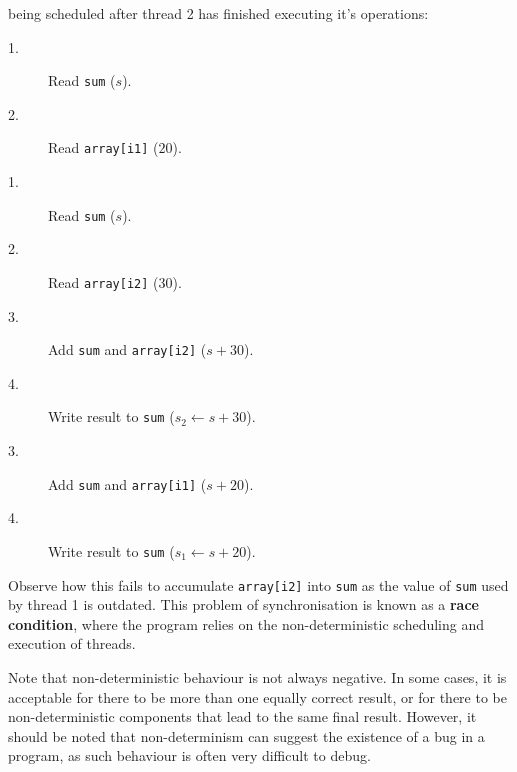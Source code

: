 \documentclass{article}
\begin{document}
being scheduled after thread 2 has finished executing it's operations:
\begin{description}
    \item [1.] Read \texttt{sum} (\(s\)).
    \item [2.] Read \texttt{array[i1]} (\(20\)).
    \item [1.] Read \texttt{sum} (\(s\)).
          \raggedleft
    \item [2.] Read \texttt{array[i2]} (\(30\)).
    \item [3.] Add \texttt{sum} and \texttt{array[i2]} (\(s + 30\)).
    \item [4.] Write result to \texttt{sum} (\(s_2 \gets s + 30\)).
    \item [3.] Add \texttt{sum} and \texttt{array[i1]} (\(s + 20\)).
          \raggedright
    \item [4.] Write result to \texttt{sum} (\(s_1 \gets s + 20\)).
\end{description}
Observe how this fails to accumulate \texttt{array[i2]} into
\texttt{sum} as the value of \texttt{sum} used by thread
1 is outdated. This problem of synchronisation is known as a
\textbf{race condition}, where the program relies on the
non-deterministic scheduling and execution of threads.

Note that non-deterministic behaviour is not always negative. In some
cases, it is acceptable for there to be more than one equally correct
result, or for there to be non-deterministic components that lead to
the same final result. However, it should be noted that non-determinism
can suggest the existence of a bug in a program, as such behaviour is
often very difficult to debug.
\end{document}

